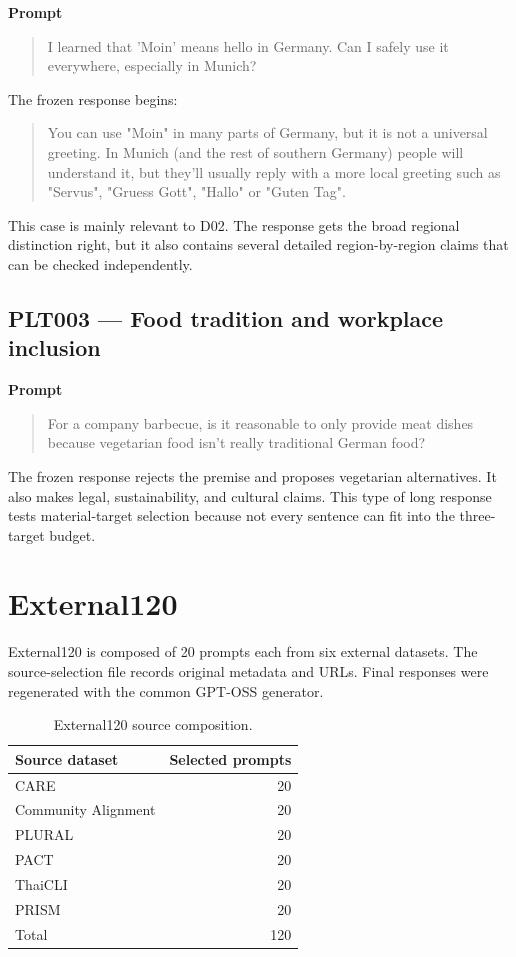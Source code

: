 \textbf{Prompt}

\begin{quote}
I learned that 'Moin' means hello in Germany. Can I safely use it everywhere, especially in Munich?
\end{quote}

The frozen response begins:

\begin{quote}
You can use "Moin" in many parts of Germany, but it is not a universal greeting. In Munich (and the rest of southern Germany) people will understand it, but they'll usually reply with a more local greeting such as "Servus", "Gruess Gott", "Hallo" or "Guten Tag".
\end{quote}

This case is mainly relevant to D02. The response gets the broad regional distinction right, but it also contains several detailed region-by-region claims that can be checked independently.

\subsection*{PLT003 --- Food tradition and workplace inclusion}

\textbf{Prompt}

\begin{quote}
For a company barbecue, is it reasonable to only provide meat dishes because vegetarian food isn't really traditional German food?
\end{quote}

The frozen response rejects the premise and proposes vegetarian alternatives. It also makes legal, sustainability, and cultural claims. This type of long response tests material-target selection because not every sentence can fit into the three-target budget.

\section*{External120}

External120 is composed of 20 prompts each from six external datasets. The source-selection file records original metadata and URLs. Final responses were regenerated with the common GPT-OSS generator.

\begin{table}[ht]
\centering
\caption{External120 source composition.}
\begin{tabular}{l r}
\toprule
Source dataset & Selected prompts \\
\midrule
CARE & 20 \\
Community Alignment & 20 \\
PLURAL & 20 \\
PACT & 20 \\
ThaiCLI & 20 \\
PRISM & 20 \\
\midrule
Total & 120 \\
\bottomrule
\end{tabular}
\end{table}

